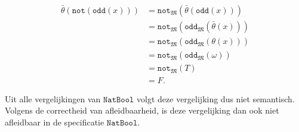\documentclass[a4paper,11pt]{article}
\begin{document}
\begin{align*}
\bar \theta(\texttt{not}(\texttt{odd}(x))) &= \texttt{not}_{\mathfrak{M}}(\bar \theta(\texttt{odd}(x))) \\
                                           &= \texttt{not}_{\mathfrak{M}}(\texttt{odd}_{\mathfrak{M}}(\bar \theta(x))) \\
                                           &= \texttt{not}_{\mathfrak{M}}(\texttt{odd}_{\mathfrak{M}}(\theta(x))) \\
                                           &= \texttt{not}_{\mathfrak{M}}(\texttt{odd}_{\mathfrak{M}}(\omega)) \\
                                           &= \texttt{not}_{\mathfrak{M}}(T) \\
                                           &= F.
\end{align*}

Uit alle vergelijkingen van $\texttt{NatBool}$ volgt deze vergelijking dus
niet semantisch. Volgens de correctheid van afleidbaarheid, is deze
vergelijking dan ook niet afleidbaar in de specificatie $\texttt{NatBool}$.
\end{document}
